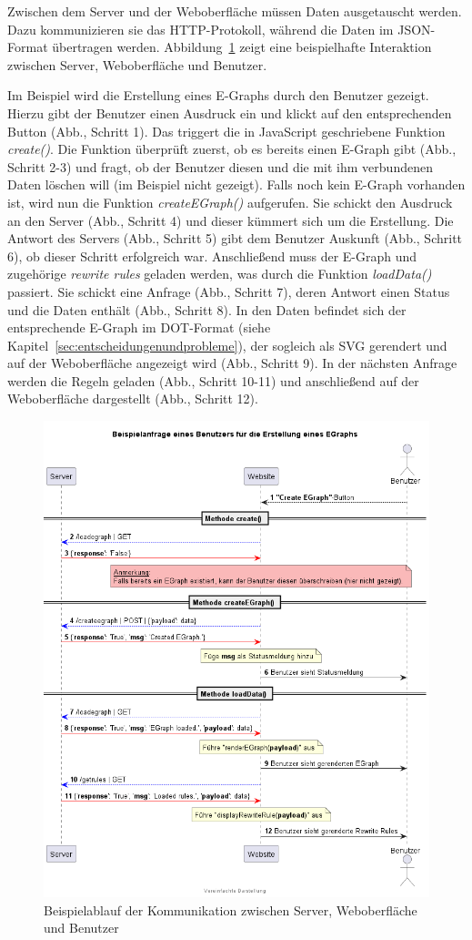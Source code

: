 Zwischen dem Server und der Weboberfläche müssen Daten ausgetauscht werden. Dazu kommunizieren sie das HTTP-Protokoll, während die Daten im 
JSON-Format übertragen werden. Abbildung~\ref{fig:ablauf} zeigt eine beispielhafte Interaktion zwischen Server, Weboberfläche und Benutzer.

Im Beispiel wird die Erstellung eines E-Graphs durch den Benutzer gezeigt. Hierzu gibt der Benutzer einen Ausdruck ein und klickt auf den entsprechenden Button (Abb., Schritt 1).
Das triggert die in JavaScript geschriebene Funktion \textit{create()}. Die Funktion überprüft zuerst, ob es bereits einen E-Graph gibt (Abb., Schritt 2-3) und fragt, ob der Benutzer
diesen und die mit ihm verbundenen Daten löschen will (im Beispiel nicht gezeigt). Falls noch kein E-Graph vorhanden ist, wird nun die Funktion \textit{createEGraph()}
aufgerufen. Sie schickt den Ausdruck an den Server (Abb., Schritt 4) und dieser kümmert sich um die Erstellung. Die Antwort des Servers (Abb., Schritt 5) gibt dem Benutzer 
Auskunft (Abb., Schritt 6), ob dieser Schritt erfolgreich war. 
Anschließend muss der E-Graph und zugehörige \textit{rewrite rules} geladen werden, was durch die Funktion \textit{loadData()} passiert.
Sie schickt eine Anfrage (Abb., Schritt 7), deren Antwort einen Status und die Daten enthält (Abb., Schritt 8). In den Daten befindet sich der entsprechende E-Graph im 
DOT-Format (siehe Kapitel~\ref{sec:entscheidungenundprobleme}), der sogleich als SVG gerendert und auf der Weboberfläche angezeigt wird (Abb., Schritt 9).
In der nächsten Anfrage werden die Regeln geladen (Abb., Schritt 10-11) und anschließend auf der Weboberfläche dargestellt (Abb., Schritt 12).

\begin{figure}[H]
  \centering
  \includegraphics[scale=0.6]{../fig/query.png}
  \caption{Beispielablauf der Kommunikation zwischen Server, Weboberfläche und Benutzer}
  \label{fig:ablauf}
\end{figure}
